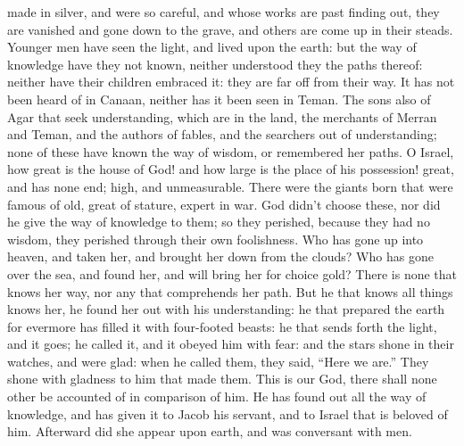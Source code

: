 {{} made in silver, and were so careful, and whose works are past finding out,
they are vanished and gone down to
 the grave, and others are come up in their steads.
Younger men have seen the light, and lived upon the earth: but the way of knowledge have they not known,
neither understood they the paths thereof: neither have their children embraced it: they are far off from
 their way.
It has not been heard of in Canaan, neither has it been seen in Teman.
The sons also of Agar that seek understanding, which are in the land, the merchants of Merran and Teman, and the authors of fables, and the searchers out of understanding; none of these have known the way of wisdom, or remembered her paths.
O Israel, how great is the house of God! and how large is the place of his possession!
great, and has none end; high, and unmeasurable.
There were the giants born that were famous of old, great of stature,
{} expert in war.
God didn’t choose these, nor did he give the way of knowledge to them;
so they perished, because they had no
 wisdom, they perished through their own foolishness.
Who has gone up into heaven, and taken her, and brought her down from the clouds?
Who has gone over the sea, and found her, and will bring her for choice gold?
There is none that knows her way, nor any that comprehends her path.
But he that knows all things knows her, he found her out with his understanding: he that prepared the earth for evermore has filled it with four-footed beasts:
he that sends forth the light, and it goes; he called it, and it obeyed him with fear:
and the stars shone in their watches, and were glad: when he called them, they said, “Here we are.” They shone with gladness to him that made them.
This is our God,
{} there shall none other be accounted of in comparison of him.
He has found out all the way of knowledge, and has given it to Jacob his servant, and to Israel that is beloved of him.
Afterward did she appear upon earth, and was conversant with men.

}
